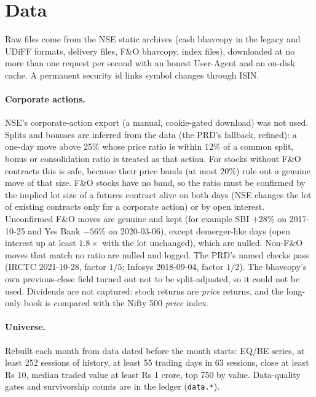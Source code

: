 \section{Data}\label{sec:data}
Raw files come from the NSE static archives (cash bhavcopy in the legacy and UDiFF formats, delivery files, F\&O bhavcopy, index files),
downloaded at no more than one request per second with an honest User-Agent and an on-disk cache. A permanent security id links symbol changes through
ISIN.

\paragraph{Corporate actions.} NSE's corporate-action export (a manual, cookie-gated download) was not used. Splits and bonuses are inferred from the
data (the PRD's fallback, refined): a one-day move above 25\% whose price ratio is within 12\% of a common split, bonus or consolidation ratio is treated
as that action. For stocks without F\&O contracts this is safe, because their price bands (at most 20\%) rule out a genuine move of that size. F\&O
stocks have no band, so the ratio must be confirmed by the implied lot size of a futures contract alive on both days (NSE changes the lot of existing
contracts only for a corporate action) or by open interest. Unconfirmed F\&O moves are genuine and kept (for example SBI $+28\%$ on 2017-10-25 and Yes Bank
$-56\%$ on 2020-03-06), except demerger-like days (open interest up at least $1.8\times$ with the lot unchanged), which are nulled. Non-F\&O moves that match
no ratio are nulled and logged. The PRD's named checks pass (IRCTC 2021-10-28, factor $1/5$; Infosys 2018-09-04, factor $1/2$). The bhavcopy's own
previous-close field turned out not to be split-adjusted, so it could not be used. Dividends are not captured: stock returns are \emph{price} returns, and
the long-only book is compared with the Nifty 500 \emph{price} index.

\paragraph{Universe.} Rebuilt each month from data dated before the month starts: EQ/BE series, at least 252 sessions of history, at least 55 trading days in
63 sessions, close at least Rs 10, median traded value at least Rs 1 crore, top 750 by value. Data-quality gates and survivorship counts are in the ledger
(\texttt{data.*}).
